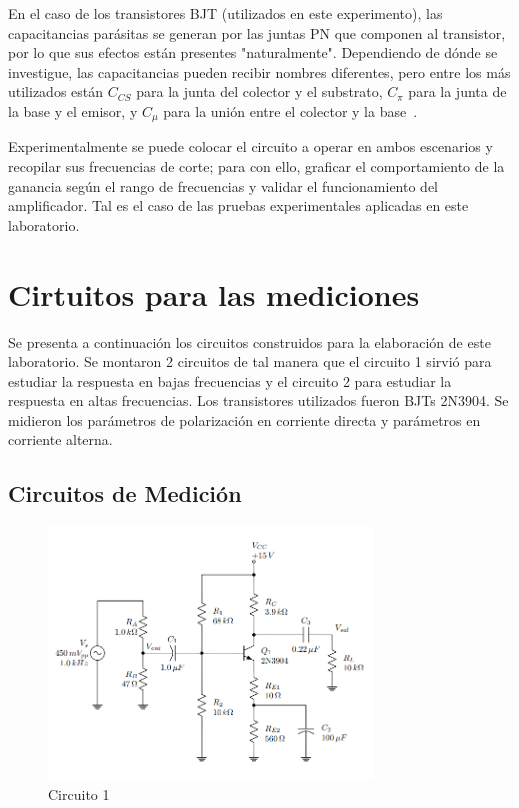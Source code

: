\documentclass[journal]{IEEEtran}
\begin{document}
En el caso de los transistores BJT (utilizados en este experimento), las capacitancias parásitas se generan por las 
juntas PN que componen al transistor, por lo que sus efectos están presentes "naturalmente". Dependiendo de dónde se investigue, 
las capacitancias pueden recibir nombres diferentes, pero entre los más utilizados están $C_{CS}$ para la junta del
colector y el substrato, $C_{\pi}$ para la junta de la base y el emisor, y $C_{\mu}$ para la unión entre el colector y la base~\cite{Razavi}.

Experimentalmente se puede colocar el circuito a operar en ambos escenarios y recopilar sus frecuencias de corte; para con ello, graficar
el comportamiento de la ganancia según el rango de frecuencias y validar el funcionamiento del amplificador. Tal es el caso de las
pruebas experimentales aplicadas en este laboratorio. 

\section{Cirtuitos para las mediciones}
Se presenta a continuación los circuitos construidos para la elaboración de este laboratorio. 
Se montaron 2 circuitos de tal manera que el circuito 1 sirvió para estudiar la respuesta en bajas frecuencias y el circuito 2 para estudiar la respuesta en altas frecuencias. 
Los transistores utilizados fueron BJTs 2N3904.
Se midieron los parámetros de polarización en corriente directa y parámetros en corriente alterna.


\subsection{Circuitos de Medición}

\begin{figure}[H]
        \centering
        \includegraphics[width=3.4in]{Circuito1.png}
        \caption{Circuito 1}
        \label{fig:SignalExperimental_024}
\end{figure}
\end{document}
